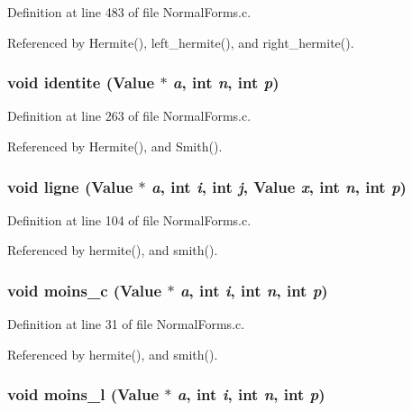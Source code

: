 Definition at line 483 of file Normal\-Forms.c.

Referenced by Hermite(), left\_\-hermite(), and right\_\-hermite().

\subsubsection{\setlength{\rightskip}{0pt plus 5cm}void identite (Value $\ast$ {\em a}, int {\em n}, int {\em p})\hspace{0.3cm}{\tt  [static]}}\label{NormalForms_8c_a8}




Definition at line 263 of file Normal\-Forms.c.

Referenced by Hermite(), and Smith().

\subsubsection{\setlength{\rightskip}{0pt plus 5cm}void ligne (Value $\ast$ {\em a}, int {\em i}, int {\em j}, Value {\em x}, int {\em n}, int {\em p})\hspace{0.3cm}{\tt  [static]}}\label{NormalForms_8c_a4}




Definition at line 104 of file Normal\-Forms.c.

Referenced by hermite(), and smith().

\subsubsection{\setlength{\rightskip}{0pt plus 5cm}void moins\_\-c (Value $\ast$ {\em a}, int {\em i}, int {\em n}, int {\em p})\hspace{0.3cm}{\tt  [static]}}\label{NormalForms_8c_a1}




Definition at line 31 of file Normal\-Forms.c.

Referenced by hermite(), and smith().

\subsubsection{\setlength{\rightskip}{0pt plus 5cm}void moins\_\-l (Value $\ast$ {\em a}, int {\em i}, int {\em n}, int {\em p})\hspace{0.3cm}{\tt  [static]}}\label{NormalForms_8c_a0}




